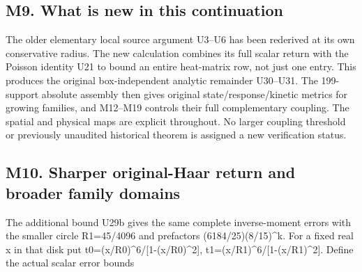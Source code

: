 \documentclass[11pt,a4paper]{article}
\renewcommand{\[}{\begingroup\small\originaldisplaystart}
\renewcommand{\]}{\originaldisplayend\endgroup}
\begin{document}
\subsection{M9. What is new in this
continuation}\label{m9.-what-is-new-in-this-continuation}

The older elementary local source argument U3--U6 has been rederived at
its own conservative radius. The new calculation combines its full
scalar return with the Poisson identity U21 to bound an entire
heat-matrix row, not just one entry. This produces the original
box-independent analytic remainder U30--U31. The 199-support absolute
assembly then gives original
{s\allowbreak{}t\allowbreak{}a\allowbreak{}t\allowbreak{}e\allowbreak{}/\allowbreak{}r\allowbreak{}e\allowbreak{}s\allowbreak{}p\allowbreak{}o\allowbreak{}n\allowbreak{}s\allowbreak{}e\allowbreak{}/\allowbreak{}k\allowbreak{}i\allowbreak{}n\allowbreak{}e\allowbreak{}t\allowbreak{}i\allowbreak{}c\allowbreak{}}
metrics for growing families, and M12--M19 controls their full
complementary coupling. The spatial and physical maps are explicit
throughout. No larger coupling threshold or previously unaudited
historical theorem is assigned a new verification status.

\subsection{M10. Sharper original-Haar return and broader family
domains}\label{m10.-sharper-original-haar-return-and-broader-family-domains}

The additional bound U29b gives the same complete inverse-moment errors
with the smaller circle R1=45/4096 and prefactors
{(\allowbreak{}6\allowbreak{}1\allowbreak{}8\allowbreak{}4\allowbreak{}/\allowbreak{}2\allowbreak{}5\allowbreak{})\allowbreak{}(\allowbreak{}8\allowbreak{}/\allowbreak{}1\allowbreak{}5\allowbreak{})\allowbreak{}\textasciicircum{}\allowbreak{}k\allowbreak{}.\allowbreak{}}
For a fixed real x in that disk put
{t\allowbreak{}0\allowbreak{}=\allowbreak{}(\allowbreak{}x\allowbreak{}/\allowbreak{}R\allowbreak{}0\allowbreak{})\allowbreak{}\textasciicircum{}\allowbreak{}6\allowbreak{}/\allowbreak{}[\allowbreak{}1\allowbreak{}-\allowbreak{}(\allowbreak{}x\allowbreak{}/\allowbreak{}R\allowbreak{}0\allowbreak{})\allowbreak{}\textasciicircum{}\allowbreak{}2\allowbreak{}]\allowbreak{},\allowbreak{}}
{t\allowbreak{}1\allowbreak{}=\allowbreak{}(\allowbreak{}x\allowbreak{}/\allowbreak{}R\allowbreak{}1\allowbreak{})\allowbreak{}\textasciicircum{}\allowbreak{}6\allowbreak{}/\allowbreak{}[\allowbreak{}1\allowbreak{}-\allowbreak{}(\allowbreak{}x\allowbreak{}/\allowbreak{}R\allowbreak{}1\allowbreak{})\allowbreak{}\textasciicircum{}\allowbreak{}2\allowbreak{}]\allowbreak{}.\allowbreak{}}
Define the actual scalar error bounds
\end{document}
